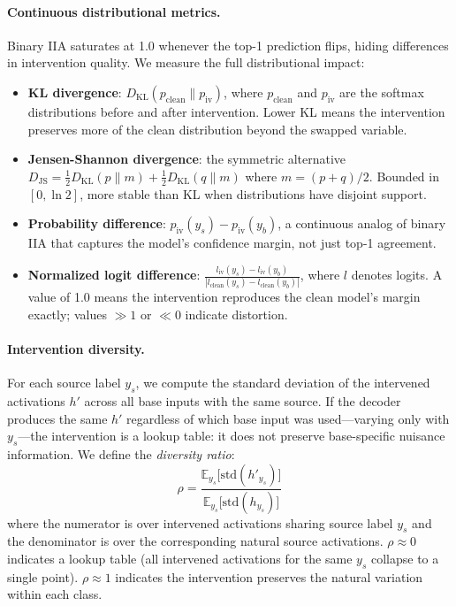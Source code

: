 \documentclass{article}
\newcommand{\KL}{D_\mathrm{KL}}
\newcommand{\JS}{D_\mathrm{JS}}
\begin{document}
\paragraph{Continuous distributional metrics.}
Binary IIA saturates at 1.0 whenever the top-1 prediction flips, hiding
differences in intervention quality. We measure the full distributional impact:
\begin{itemize}[leftmargin=*]
\item \textbf{KL divergence}: $\KL(p_\text{clean} \| p_\text{iv})$, where
  $p_\text{clean}$ and $p_\text{iv}$ are the softmax distributions before and
  after intervention. Lower KL means the intervention preserves more of the
  clean distribution beyond the swapped variable.
\item \textbf{Jensen-Shannon divergence}: the symmetric alternative
  $\JS = \frac{1}{2}\KL(p \| m) + \frac{1}{2}\KL(q \| m)$ where $m = (p+q)/2$.
  Bounded in $[0, \ln 2]$, more stable than KL when distributions have disjoint
  support.
\item \textbf{Probability difference}: $p_\text{iv}(y_s) - p_\text{iv}(y_b)$,
  a continuous analog of binary IIA that captures the model's confidence margin,
  not just top-1 agreement.
\item \textbf{Normalized logit difference}:
  $\frac{l_\text{iv}(y_s) - l_\text{iv}(y_b)}{|l_\text{clean}(y_s) - l_\text{clean}(y_b)|}$,
  where $l$ denotes logits. A value of 1.0 means the intervention reproduces the
  clean model's margin exactly; values $\gg 1$ or $\ll 0$ indicate distortion.
\end{itemize}

\paragraph{Intervention diversity.}
For each source label $y_s$, we compute the standard deviation of the intervened
activations $h'$ across all base inputs with the same source. If the decoder
produces the same $h'$ regardless of which base input was used---varying only
with $y_s$---the intervention is a lookup table: it does not preserve
base-specific nuisance information. We define the \emph{diversity ratio}:
\begin{equation}
\rho = \frac{\mathbb{E}_{y_s}\bigl[\text{std}(h'_{y_s})\bigr]}
            {\mathbb{E}_{y_s}\bigl[\text{std}(h_{y_s})\bigr]}
\label{eq:diversity_ratio}
\end{equation}
where the numerator is over intervened activations sharing source label $y_s$
and the denominator is over the corresponding natural source activations.
$\rho \approx 0$ indicates a lookup table (all intervened activations for the
same $y_s$ collapse to a single point). $\rho \approx 1$ indicates the
intervention preserves the natural variation within each class.
\end{document}
